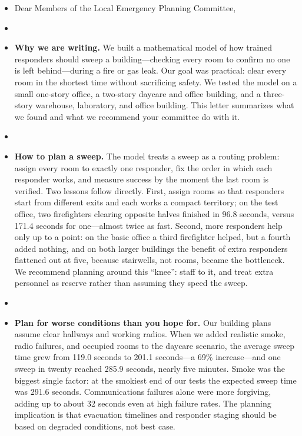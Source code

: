 \documentclass{mcmthesis}
\begin{document}
\begin{itemize}[leftmargin=0em,itemsep=4pt]
\item[] Dear Members of the Local Emergency Planning Committee,
\item[]
\item[] \textbf{Why we are writing.} We built a mathematical model of how trained responders should sweep a building---checking every room to confirm no one is left behind---during a fire or gas leak. Our goal was practical: clear every room in the shortest time without sacrificing safety. We tested the model on a small one-story office, a two-story daycare and office building, and a three-story warehouse, laboratory, and office building. This letter summarizes what we found and what we recommend your committee do with it.
\item[]
\item[] \textbf{How to plan a sweep.} The model treats a sweep as a routing problem: assign every room to exactly one responder, fix the order in which each responder works, and measure success by the moment the last room is verified. Two lessons follow directly. First, assign rooms so that responders start from different exits and each works a compact territory; on the test office, two firefighters clearing opposite halves finished in 96.8 seconds, versus 171.4 seconds for one---almost twice as fast. Second, more responders help only up to a point: on the basic office a third firefighter helped, but a fourth added nothing, and on both larger buildings the benefit of extra responders flattened out at five, because stairwells, not rooms, became the bottleneck. We recommend planning around this ``knee'': staff to it, and treat extra personnel as reserve rather than assuming they speed the sweep.
\item[]
\item[] \textbf{Plan for worse conditions than you hope for.} Our building plans assume clear hallways and working radios. When we added realistic smoke, radio failures, and occupied rooms to the daycare scenario, the average sweep time grew from 119.0 seconds to 201.1 seconds---a 69\% increase---and one sweep in twenty reached 285.9 seconds, nearly five minutes. Smoke was the biggest single factor: at the smokiest end of our tests the expected sweep time was 291.6 seconds. Communications failures alone were more forgiving, adding up to about 32 seconds even at high failure rates. The planning implication is that evacuation timelines and responder staging should be based on degraded conditions, not best case.

\end{itemize}
\end{document}
